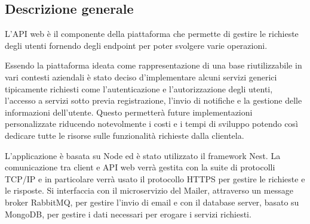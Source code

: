 \subsection{Descrizione generale}
L'API web è il componente della piattaforma che permette di gestire le richieste degli utenti fornendo degli
endpoint per poter svolgere varie operazioni.

Essendo la piattaforma ideata come rappresentazione di una base riutilizzabile in vari contesti aziendali è stato deciso d'implementare alcuni servizi
generici tipicamente richiesti come l'autenticazione e l'autorizzazione degli utenti, l'accesso a servizi sotto previa registrazione, l'invio di notifiche e
la gestione delle informazioni dell'utente. Questo permetterà future implementazioni personalizzate riducendo notevolmente i costi e i tempi di sviluppo potendo così dedicare
tutte le risorse sulle funzionalità richieste dalla clientela.

L'applicazione è basata su Node ed è stato utilizzato il framework Nest.
La comunicazione tra client e API web verrà gestita con la suite di protocolli TCP/IP e in particolare verrà usato il protocollo HTTPS per gestire
le richieste e le risposte.
Si interfaccia con il microservizio del Mailer, attraverso un message broker RabbitMQ, per gestire l'invio di email e con il database server, basato su MongoDB, per gestire i dati necessari
per erogare i servizi richiesti.
